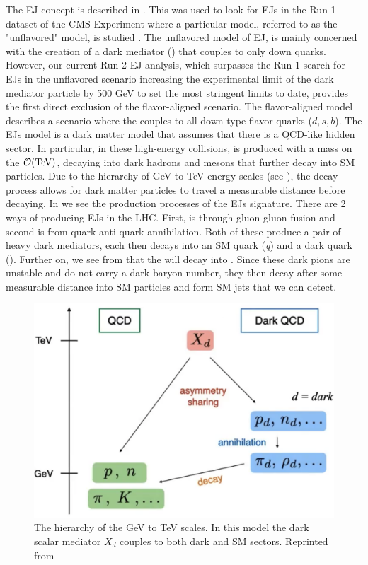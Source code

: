 The EJ concept is described in \cite{Schwaller:2015gea}. This was used to look for EJs in the Run 1 dataset of the CMS Experiment where a particular model, referred to as the "unflavored" model, is studied \cite{sirunyan2019search}. The unflavored model of EJ, is mainly concerned with the creation of a dark mediator (\Mdark) that couples to only down quarks.
However, our current Run-2 EJ analysis, which surpasses the Run-1 search for EJs in the unflavored scenario increasing the experimental limit of the dark mediator particle by 500 GeV to set the most stringent limits to date, provides the first direct exclusion of the flavor-aligned scenario.
The flavor-aligned model describes a scenario where the \Mdark couples to all down-type flavor quarks ($d, s, b$).
The EJs model is a dark matter model that assumes that there is a QCD-like hidden sector. In particular, in these high-energy collisions, \Mdark is produced with a mass on the $\order{\text{TeV}}$, decaying into dark hadrons and mesons that further decay into SM particles. Due to the hierarchy of GeV to TeV energy scales (see ), the decay process allows for dark matter particles to travel a measurable distance before decaying.
In  we see the production processes of the EJs signature. There are 2 ways of producing EJs in the LHC. First, is through gluon-gluon fusion and second is from quark anti-quark annihilation.
Both of these produce a pair of heavy dark mediators, each then decays into an SM quark (\textit{q}) and a dark quark (\Qdark). Further on, we see from  that the \Qdark will decay into \pidark.
Since these dark pions are unstable and do not carry a dark baryon number, they then decay after some measurable distance into SM particles \cite{Bai_2014} and form SM jets that we can detect.


\begin{figure}
	\centering
	\includegraphics[width=0.8\linewidth]{Images/DarkQCDModel.png}
	\caption[The hierarchy of the GeV to TeV scales.]{The hierarchy of the GeV to TeV scales. In this model the dark scalar mediator $X_d$ couples to both dark and SM sectors. Reprinted from \cite{Schwaller:2015gea}}
	\label{fig:dark-qcdmodel}
\end{figure}


